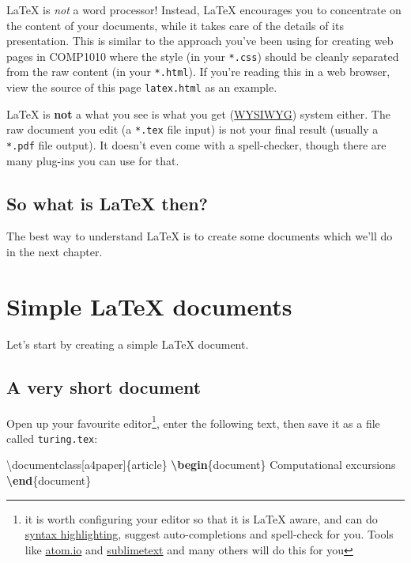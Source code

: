 \documentclass[
]{book}
\newenvironment{Shaded}{\begin{snugshade}}{\end{snugshade}}
\newcommand{\BuiltInTok}[1]{#1}
\newcommand{\ExtensionTok}[1]{#1}
\newcommand{\KeywordTok}[1]{\textcolor[rgb]{0.13,0.29,0.53}{\textbf{#1}}}
\newcommand{\NormalTok}[1]{#1}
\begin{document}
LaTeX is \emph{not} a word processor! Instead, LaTeX encourages you to concentrate on the content of your documents, while it takes care of the details of its presentation. This is similar to the approach you've been using for creating web pages in COMP1010 where the style (in your \texttt{*.css}) should be cleanly separated from the raw content (in your \texttt{*.html}). If you're reading this in a web browser, view the source of this page \texttt{latex.html} as an example.

LaTeX is \textbf{not} a what you see is what you get (\href{https://en.wikipedia.org/wiki/WYSIWYG}{WYSIWYG}) system either. The raw document you edit (a \texttt{*.tex} file input) is not your final result (usually a \texttt{*.pdf} file output). It doesn't even come with a spell-checker, though there are many plug-ins you can use for that.

\hypertarget{so-what-is-latex-then}{%
\section{So what is LaTeX then?}\label{so-what-is-latex-then}}

The best way to understand LaTeX is to create some documents which we'll do in the next chapter.

\hypertarget{simples}{%
\chapter{Simple LaTeX documents}\label{simples}}

Let's start by creating a simple LaTeX document.

\hypertarget{shortest}{%
\section{A very short document}\label{shortest}}

Open up your favourite editor\footnote{it is worth configuring your editor so that it is LaTeX aware, and can do \href{https://en.wikipedia.org/wiki/Syntax_highlighting}{syntax highlighting}, suggest auto-completions and spell-check for you. Tools like \href{https://atom.io/}{atom.io} and \href{https://www.sublimetext.com/}{sublimetext} and many others will do this for you}, enter the following text, then save it as a file called \texttt{turing.tex}:

\begin{Shaded}
\begin{Highlighting}[]
\BuiltInTok{\textbackslash{}documentclass}\NormalTok{[a4paper]\{}\ExtensionTok{article}\NormalTok{\}}
\KeywordTok{\textbackslash{}begin}\NormalTok{\{}\ExtensionTok{document}\NormalTok{\}}
\NormalTok{Computational excursions}
\KeywordTok{\textbackslash{}end}\NormalTok{\{}\ExtensionTok{document}\NormalTok{\}}
\end{Highlighting}
\end{Shaded}
\end{document}
